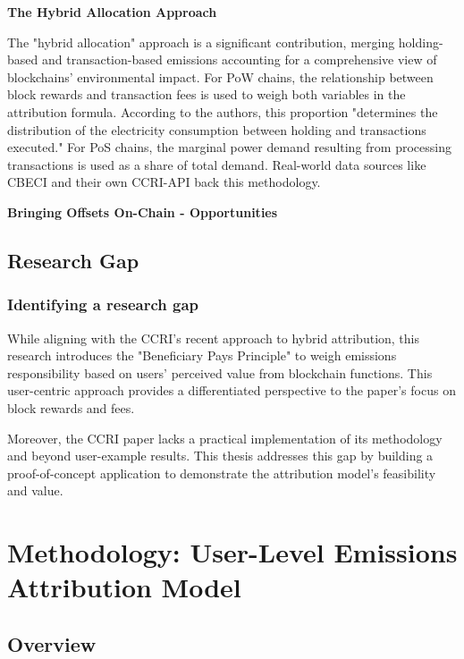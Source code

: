 \documentclass[11pt]{report}
\begin{document}
\textbf{The Hybrid Allocation Approach}

The "hybrid allocation" approach is a significant contribution, merging holding-based and transaction-based emissions accounting for a comprehensive view of blockchains' environmental impact. For PoW chains, the relationship between block rewards and transaction fees is used to weigh both variables in the attribution formula. According to the authors, this proportion "determines the distribution of the electricity consumption between holding and transactions executed." For PoS chains, the marginal power demand resulting from processing transactions is used as a share of total demand. Real-world data sources like CBECI and their own CCRI-API back this methodology.


\textbf{Bringing Offsets On-Chain - Opportunities}






\section{Research Gap}

\subsection{Identifying a research gap}

While aligning with the CCRI's recent approach to hybrid attribution, this research introduces the "Beneficiary Pays Principle" to weigh emissions responsibility based on users' perceived value from blockchain functions. This user-centric approach provides a differentiated perspective to the paper's focus on block rewards and fees.

Moreover, the CCRI paper lacks a practical implementation of its methodology and beyond user-example results. This thesis addresses this gap by building a proof-of-concept application to demonstrate the attribution model's feasibility and value.


\chapter{Methodology: User-Level Emissions Attribution Model}
\section{Overview \label{se:methodology_overview}}
\end{document}
